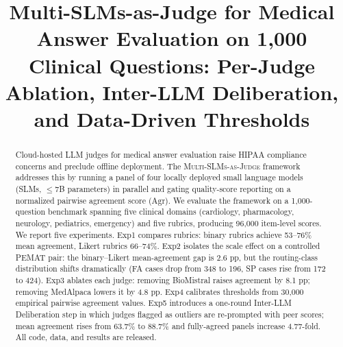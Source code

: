 \documentclass[conference]{IEEEtran}
\begin{document}
\title{Multi-SLMs-as-Judge for Medical Answer Evaluation on 1,000\\
Clinical Questions: Per-Judge Ablation, Inter-LLM Deliberation,\\
and Data-Driven Thresholds}

\author{
\and
{}
\and
{}
}

\maketitle

\begin{abstract}
Cloud-hosted LLM judges for medical answer evaluation raise HIPAA
compliance concerns and preclude offline deployment. The
\textsc{Multi-SLMs-as-Judge} framework addresses this by running a
panel of four locally deployed small language models (SLMs,
$\leq$7B parameters) in parallel and gating quality-score reporting
on a normalized pairwise agreement score ($\mathrm{Agr}$). We evaluate
the framework on a 1,000-question benchmark spanning five clinical
domains (cardiology, pharmacology, neurology, pediatrics, emergency)
and five rubrics, producing 96,000 item-level scores. We report five
experiments. Exp1 compares rubrics: binary rubrics achieve 53--76\%
mean agreement, Likert rubrics 66--74\%. Exp2 isolates the scale effect
on a controlled PEMAT pair: the binary--Likert mean-agreement gap is
2.6 pp, but the routing-class distribution shifts dramatically
(FA cases drop from 348 to 196, SP cases rise from 172 to 424).
Exp3 ablates each judge: removing BioMistral raises agreement by
8.1 pp; removing MedAlpaca lowers it by 4.8 pp. Exp4 calibrates
thresholds from 30,000 empirical pairwise agreement values. Exp5
introduces a one-round Inter-LLM Deliberation step in which judges
flagged as outliers are re-prompted with peer scores; mean
agreement rises from 63.7\% to 88.7\% and fully-agreed panels
increase 4.77-fold. All code, data, and results are released.
\end{abstract}
\end{document}
